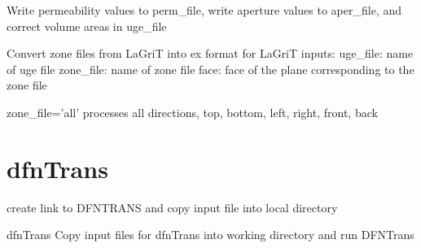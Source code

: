 \documentclass[letterpaper,10pt,english]{sphinxmanual}
\begin{document}
\begin{fulllineitems}
\label{\detokenize{pydfnworks:pydfnworks.flow.write_perms_and_correct_volumes_areas}}
Write permeability values to perm\_file, write aperture values to aper\_file, and correct volume areas in uge\_file

\end{fulllineitems}


\begin{fulllineitems}
\label{\detokenize{pydfnworks:pydfnworks.flow.zone2ex}}
Convert zone files from LaGriT into ex format for LaGriT
inputs:
uge\_file: name of uge file
zone\_file: name of zone file
face: face of the plane corresponding to the zone file

zone\_file=’all’ processes all directions, top, bottom, left, right, front, back

\end{fulllineitems}



\section{dfnTrans}
\label{\detokenize{pydfnworks:module-pydfnworks.transport}}\label{\detokenize{pydfnworks:dfntrans}}

\begin{fulllineitems}
\label{\detokenize{pydfnworks:pydfnworks.transport.copy_dfn_trans_files}}
create link to DFNTRANS and copy input file into local directory

\end{fulllineitems}


\begin{fulllineitems}
\label{\detokenize{pydfnworks:pydfnworks.transport.dfn_trans}}
dfnTrans
Copy input files for dfnTrans into working directory and run DFNTrans

\end{fulllineitems}
\end{document}
